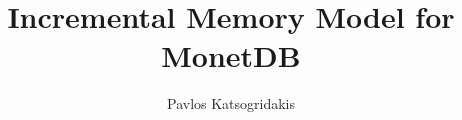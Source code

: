 \documentclass[]{beamer}
\title{Incremental Memory Model for MonetDB}
\author{Pavlos Katsogridakis}
\begin{document}
\begin{frame}[plain]
	\titlepage
\end{frame}



% 
% 
% 

%     
%     

% 
\end{document}
